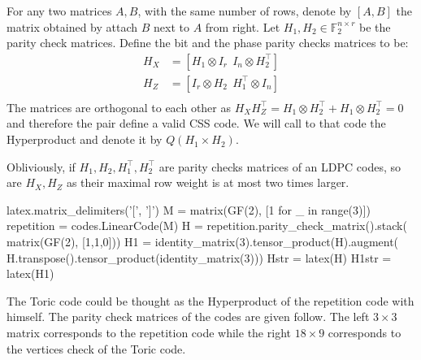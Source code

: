 \begin{definition}
  For any two matrices $A,B$, with the same number of rows, denote by $\left[ A,B \right]$ the matrix obtained by attach $B$ next to $A$ from right.  Let $H_{1}, H_{2} \in \mathbb{F}_{2}^{n\times r}$ be the parity check matrices. Define the bit and the phase parity checks matrices to be:          
\begin{equation*}
  \begin{split}
    H_{X} &= \left[ H_{1} \otimes I_{r} \ \  I_{n} \otimes H^{\top}_{2} \right] \\ 
    H_{Z} &= \left[ I_{r} \otimes H_{2} \ \  H_{1}^{\top} \otimes I_{n} \right] \\ 
  \end{split}
  \label{equ:css}
\end{equation*}
The matrices are orthogonal to each other as $H_{X}H_{Z}^{\top} = H_{1}\otimes H^{\top}_{2} + H_{1}\otimes H^{\top}_{2} = 0$ and therefore the pair define a valid CSS code. We will call to that code the Hyperproduct and denote it by $Q\left( H_{1} \times H_{2} \right)$.
\end{definition}
Obliviously, if $H_{1},H_{2},H_{1}^{\top},H_{2}^{\top}$ are parity checks matrices of an LDPC codes, so are $H_{X},H_{Z}$ as their maximal row weight is at most two times larger.   


\begin{sagesilent}
latex.matrix_delimiters('[', ']')
M = matrix(GF(2), [1 for _ in range(3)])
repetition = codes.LinearCode(M)
H = repetition.parity_check_matrix().stack( matrix(GF(2), [1,1,0]))
H1 = identity_matrix(3).tensor_product(H).augment( H.transpose().tensor_product(identity_matrix(3)))
Hstr = latex(H)
H1str = latex(H1)
\end{sagesilent}

\begin{example}
  The Toric code could be thought as the Hyperproduct of the repetition code with himself. The parity check matrices of the codes are given follow. The left $3 \times 3$ matrix corresponds to the repetition code while the right $18 \times  9$ corresponds to the vertices check of the Toric code.  
\end{example}

